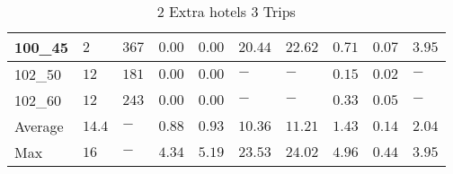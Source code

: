 \begin{center}
\begin{table}[]
\begin{adjustwidth}{-0.4in}{-1in}
\begin{tabular}{|lll|l|l|ll|lll|}
100\_45  & $2   $ & $367 $ & $\bm{0.00}  $ & $\bm{0.00}$ & $20.44$ & $22.62$ & $0.71  $ & $0.07    $ & $3.95     $ \\
\hline
102\_50  & $12  $ & $181 $ & $\bm{0.00}  $ & $\bm{0.00}$ & $-    $ & $-    $ & $0.15  $ & $0.02    $ & $-        $ \\
102\_60  & $12  $ & $243 $ & $\bm{0.00}  $ & $\bm{0.00}$ & $-    $ & $-    $ & $0.33  $ & $0.05    $ & $-        $ \\
\hline
Average  & $14.4$ & $-   $ & $0.88  $ & $0.93$ & $10.36$ & $11.21$ & $1.43  $ & $0.14    $ & $2.04     $ \\
Max      & $16  $ & $-   $ & $4.34  $ & $5.19$ & $23.53$ & $24.02$ & $4.96  $ & $0.44    $ & $3.95     $ \\
\hline
\end{tabular}
    \end{adjustwidth}
    \caption{2 Extra hotels 3 Trips}
    \label{2-3}
    \end{table}
\end{center}
